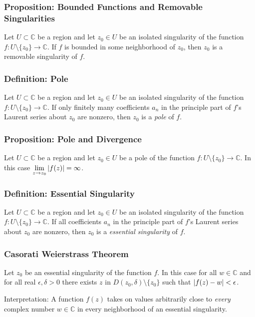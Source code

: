 \documentclass[11pt, a4paper]{article}
\newcommand{\C}{\mathbb{C}} %
\begin{document}
\subsubsection{Proposition: Bounded Functions and Removable Singularities}
Let $ U \subset \C $ be a region and let $ z_0 \in U $ be an isolated singularity of the function $ f: U \setminus \{z_0\} \to \C $. If $ f $ is bounded in some neighborhood of $ z_0 $, then $ z_0 $ is a removable singularity of $ f $.


\subsubsection{Definition: Pole}
Let $ U \subset \C $ be a region and let $ z_0 \in U $ be an isolated singularity of the function $ f: U \setminus \{z_0\} \to \C $. If only finitely many coefficients $ a_n $ in the principle part of $ f $'s Laurent series about $ z_0 $ are nonzero, then $ z_0 $ is a \textit{pole} of $ f $.

\subsubsection{Proposition: Pole and Divergence}
Let $ U \subset \C $ be a region and let $ z_0 \in U $ be a pole of the function $ f: U \setminus \{z_0\} \to \C $. In this case $ \displaystyle{\lim_{z \to z_0} \abs{f(z)} = \infty} $.


\subsubsection{Definition: Essential Singularity}
Let $ U \subset \C $ be a region and let $ z_0 \in U $ be an isolated singularity of the function $ f: U \setminus \{z_0\} \to \C $. If all coefficients $ a_n $ in the principle part of $ f $'s Laurent series about $ z_0 $ are nonzero, then $ z_0 $ is a \textit{essential singularity} of $ f $.\\



\subsubsection{Casorati Weierstrass Theorem}
Let $ z_0 $ be an essential singularity of the function $ f $. In this case for all $ w \in \C $ and for all real $ \epsilon, \delta > 0 $ there exists $ z $ in $ D(z_0, \delta) \setminus \{z_0 \} $ such that $ \abs{f(z) - w} < \epsilon $.

Interpretation: A function $ f(z) $ takes on values arbitrarily close to \textit{every} complex number $ w \in \C $ in every neighborhood of an essential singularity.
\end{document}
